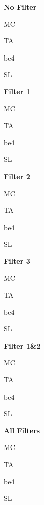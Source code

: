 





\thispagestyle{fancy}


\textbf{No Filter}
\newcommand*{\nofilter}{20181211/no_filter}

MC

TA

be4

SL



\textbf{Filter 1}
\newcommand*{\pus}{20181211/p_us_updated}

MC

TA

be4

SL




\textbf{Filter 2}
\newcommand*{\ret}{20181211/ret}

MC

TA

be4

SL



\textbf{Filter 3}
\newcommand*{\winsor}{20181211/winsor}

MC

TA

be4

SL



\textbf{Filter 1\&2}
\newcommand*{\nowinsor}{20181211/no_winsor}

MC

TA

be4

SL



\textbf{All Filters}
\newcommand*{\all}{20181211/all_filters}

MC

TA

be4

SL



